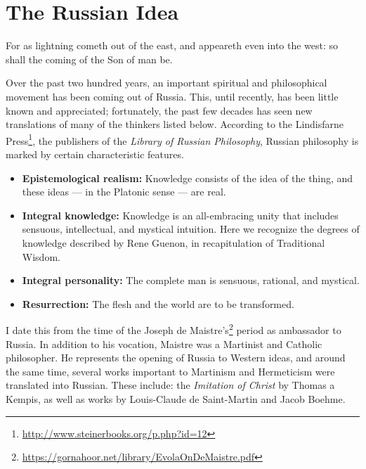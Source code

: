 \section{The Russian Idea}

\begin{quotex}
For as lightning cometh out of the east, and appeareth even into the west: so shall the coming of the Son of man be. 
\end{quotex}


Over the past two hundred years, an important spiritual and philosophical movement has been coming out of Russia. This, until recently, has been little known and appreciated; fortunately, the past few decades has seen new translations of many of the thinkers listed below. According to the Lindisfarne Press\footnote{\url{http://www.steinerbooks.org/p.php?id=12}}, the publishers of the \textit{Library of Russian Philosophy}, Russian philosophy is marked by certain characteristic features.

\begin{itemize}


\item \textbf{Epistemological realism:} Knowledge consists of the idea of the thing, and these ideas --- in the Platonic sense --- are real.

\item \textbf{Integral knowledge:} Knowledge is an all-embracing unity that includes sensuous, intellectual, and mystical intuition. Here we recognize the degrees of knowledge described by Rene Guenon, in recapitulation of Traditional Wisdom.

\item \textbf{Integral personality:} The complete man is sensuous, rational, and mystical.

\item \textbf{Resurrection:} The flesh and the world are to be transformed.
\end{itemize}


I date this from the time of the Joseph de Maistre's\footnote{\url{https://gornahoor.net/library/EvolaOnDeMaistre.pdf}} period as ambassador to Russia. In addition to his vocation, Maistre was a Martinist and Catholic philosopher. He represents the opening of Russia to Western ideas, and around the same time, several works important to Martinism and Hermeticism were translated into Russian. These include: the \textit{Imitation of Christ} by Thomas a Kempis, as well as works by Louis-Claude de Saint-Martin and Jacob Boehme.


